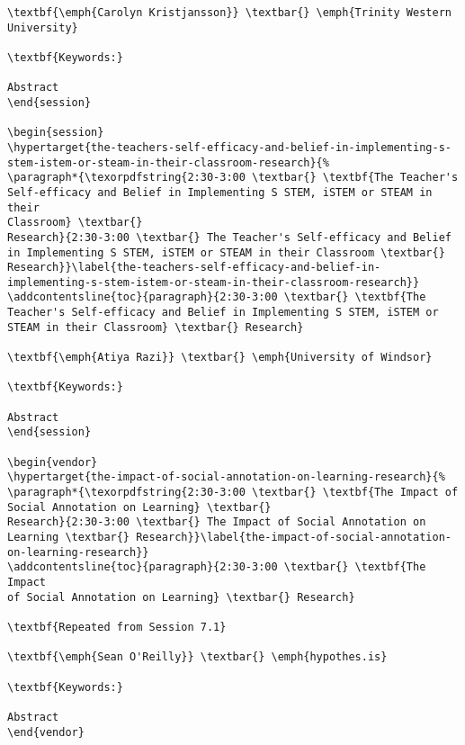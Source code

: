 \documentclass[
]{book}
\begin{document}
\begin{verbatim}
\textbf{\emph{Carolyn Kristjansson}} \textbar{} \emph{Trinity Western
University}

\textbf{Keywords:}

Abstract
\end{session}

\begin{session}
\hypertarget{the-teachers-self-efficacy-and-belief-in-implementing-s-stem-istem-or-steam-in-their-classroom-research}{%
\paragraph*{\texorpdfstring{2:30-3:00 \textbar{} \textbf{The Teacher's
Self-efficacy and Belief in Implementing S STEM, iSTEM or STEAM in their
Classroom} \textbar{}
Research}{2:30-3:00 \textbar{} The Teacher's Self-efficacy and Belief in Implementing S STEM, iSTEM or STEAM in their Classroom \textbar{} Research}}\label{the-teachers-self-efficacy-and-belief-in-implementing-s-stem-istem-or-steam-in-their-classroom-research}}
\addcontentsline{toc}{paragraph}{2:30-3:00 \textbar{} \textbf{The
Teacher's Self-efficacy and Belief in Implementing S STEM, iSTEM or
STEAM in their Classroom} \textbar{} Research}

\textbf{\emph{Atiya Razi}} \textbar{} \emph{University of Windsor}

\textbf{Keywords:}

Abstract
\end{session}

\begin{vendor}
\hypertarget{the-impact-of-social-annotation-on-learning-research}{%
\paragraph*{\texorpdfstring{2:30-3:00 \textbar{} \textbf{The Impact of
Social Annotation on Learning} \textbar{}
Research}{2:30-3:00 \textbar{} The Impact of Social Annotation on Learning \textbar{} Research}}\label{the-impact-of-social-annotation-on-learning-research}}
\addcontentsline{toc}{paragraph}{2:30-3:00 \textbar{} \textbf{The Impact
of Social Annotation on Learning} \textbar{} Research}

\textbf{Repeated from Session 7.1}

\textbf{\emph{Sean O'Reilly}} \textbar{} \emph{hypothes.is}

\textbf{Keywords:}

Abstract
\end{vendor}


\end{verbatim}
\end{document}
